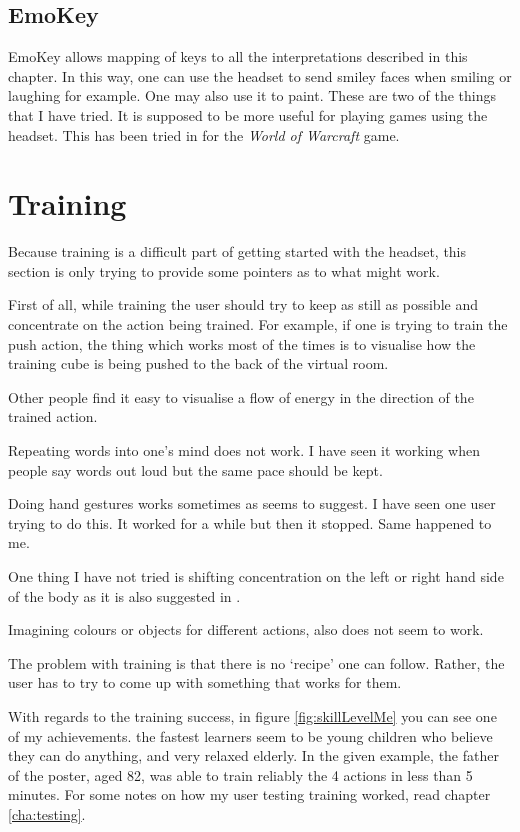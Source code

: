 \subsection{EmoKey}
EmoKey allows mapping of keys to all the interpretations described in this chapter. In this way, one can use the headset to send smiley faces when smiling or laughing for example. One may also use it to paint. These are two of the things that I have tried. It is supposed to be more useful for playing games using the headset. This has been tried in \cite{wowControl} for the \textit{World of Warcraft} game.

\section{Training}
Because training is a difficult part of getting started with the headset, this section is only trying to provide some pointers as to what might work. 

First of all, while training the user should try to keep as still as possible and concentrate on the action being trained. For example, if one is trying to train the push action, the thing which works most of the times is to visualise how the training cube is being pushed to the back of the virtual room. 

Other people find it easy to visualise a flow of energy in the direction of the trained action. 

Repeating words into one's mind does not work. I have seen it working when people say words out loud but the same pace should be kept.

Doing hand gestures works sometimes as \cite{emoTraining} seems to suggest. I have seen one user trying to do this. It worked for a while but then it stopped. Same happened to me.

One thing I have not tried is shifting concentration on the left or right hand side of the body as it is also suggested in \cite{emoTraining}.

Imagining colours or objects for different actions, also does not seem to work.

The problem with training is that there is no `recipe' one can follow. Rather, the user has to try to come up with something that works for them. 

With regards to the training success, in figure \ref{fig:skillLevelMe} you can see one of my achievements. \cite{emoTraining} the fastest learners seem to be young children who believe they can do anything, and very relaxed elderly. In the given example, the father of the poster, aged 82, was able to train reliably the 4 actions in less than 5 minutes. For some notes on how my user testing training worked, read chapter \ref{cha:testing}.

